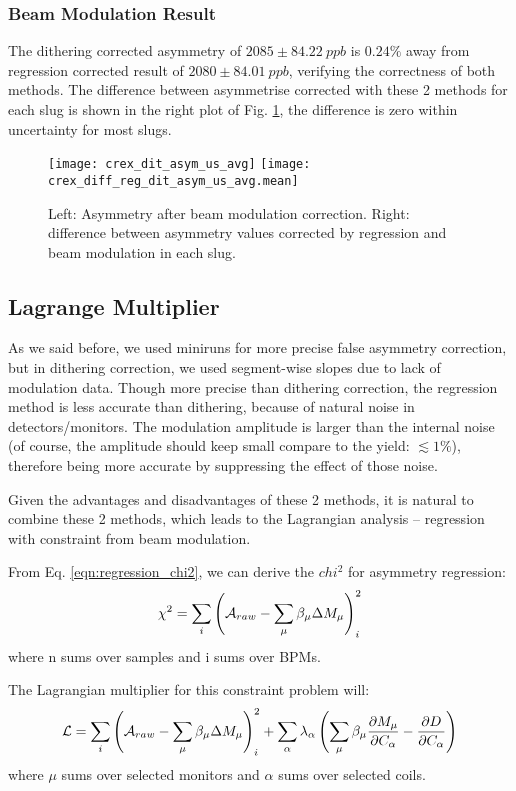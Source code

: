 \subsubsection{Beam Modulation Result}
The dithering corrected asymmetry of $2085 \pm 84.22\ ppb$ is $0.24\%$ away from
regression corrected result of $2080 \pm 84.01\ ppb$, verifying the correctness
of both methods. The difference between asymmetrise corrected with these 2 methods
for each slug is shown in the right plot of Fig. \ref{fig:dit_result}, the difference
is zero within uncertainty for most slugs.
\begin{figure}[H]
    \centering
    \texttt{[image: crex\_dit\_asym\_us\_avg]}
    \texttt{[image: crex\_diff\_reg\_dit\_asym\_us\_avg.mean]}
    \caption{Left: Asymmetry after beam modulation correction.
    Right: difference between asymmetry values corrected by regression and
    beam modulation in each slug.}
    \label{fig:dit_result}
\end{figure}


\subsection{Lagrange Multiplier}
As we said before, we used miniruns for more precise false asymmetry correction, 
but in dithering correction, we used segment-wise slopes due to lack of modulation
data. Though more precise than dithering correction, the regression method is 
less accurate than dithering, because of natural noise in detectors/monitors. 
The modulation amplitude is larger than the internal noise (of course, the amplitude
should keep small compare to the yield: $\lesssim 1\%$), therefore being
more accurate by suppressing the effect of those noise.

Given the advantages and disadvantages of these 2 methods, it is natural to 
combine these 2 methods, which leads to the Lagrangian analysis -- regression
with constraint from beam modulation.

From Eq. \ref{eqn:regression_chi2}, we can derive the $chi^2$ for asymmetry regression:
\begin{equation}
    \chi^2 = \sum_i \left( \mathcal{A}_{raw} - \sum_\mu \beta_\mu \Delta M_\mu \right)_i^2
\end{equation}
where n sums over samples and i sums over BPMs.

The Lagrangian multiplier for this constraint problem will:
\begin{equation}
    \mathcal{L} = \sum_i \left( \mathcal{A}_{raw} - \sum_\mu \beta_\mu \Delta M_\mu \right)_i^2+ \sum_\alpha \lambda_\alpha \left(\sum_\mu \beta_\mu \frac{\partial M_\mu}{\partial C_\alpha} - \frac{\partial D}{\partial C_\alpha} \right)
\end{equation}
where $\mu$ sums over selected monitors and $\alpha$ sums over selected coils.

